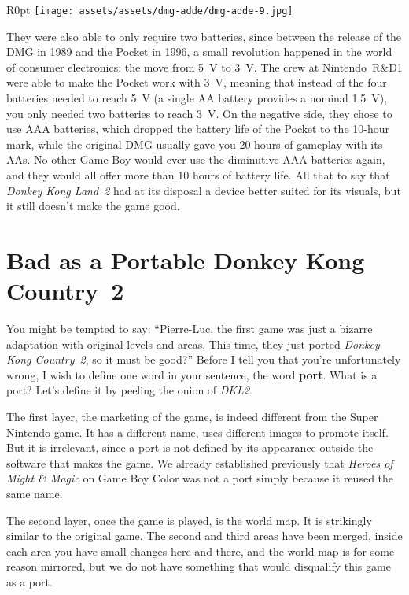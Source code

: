 \documentclass{book}
\begin{document}
\begin{wrapfigure}{R}{0pt} \texttt{[image: assets/assets/dmg-adde/dmg-adde-9.jpg]}\end{wrapfigure}
They were also able to only require two batteries, since between the release of the DMG in 1989 and the Pocket in 1996, a small revolution happened in the world of consumer electronics: the move from 5 V to 3 V. The crew at Nintendo R\&D1 were able to make the Pocket work with 3 V, meaning that instead of the four batteries needed to reach 5 V (a single AA battery provides a nominal 1.5 V), you only needed two batteries to reach 3 V. On the negative side, they chose to use AAA batteries, which dropped the battery life of the Pocket to the 10-hour mark, while the original DMG usually gave you 20 hours of gameplay with its AAs. No other Game Boy would ever use the diminutive AAA batteries again, and they would all offer more than 10 hours of battery life. All that to say that \emph{Donkey Kong Land 2} had at its disposal a device better suited for its visuals, but it still doesn’t make the game good.

\FloatBarrier\needspace{10mm}\section*{Bad as a Portable Donkey Kong Country 2}\nopagebreak[4]

You might be tempted to say: “Pierre-Luc, the first game was just a bizarre adaptation with original levels and areas. This time, they just ported \emph{Donkey Kong Country 2}, so it must be good?” Before I tell you that you’re unfortunately wrong, I wish to define one word in your sentence, the word \textbf{port}. What is a port? Let’s define it by peeling the onion of \emph{DKL2}.

The first layer, the marketing of the game, is indeed different from the Super Nintendo game. It has a different name, uses different images to promote itself. But it is irrelevant, since a port is not defined by its appearance outside the software that makes the game. We already established previously that \emph{Heroes of Might \& Magic} on Game Boy Color was not a port simply because it reused the same name.

The second layer, once the game is played, is the world map. It is strikingly similar to the original game. The second and third areas have been merged, inside each area you have small changes here and there, and the world map is for some reason mirrored, but we do not have something that would disqualify this game as a port.
\end{document}
